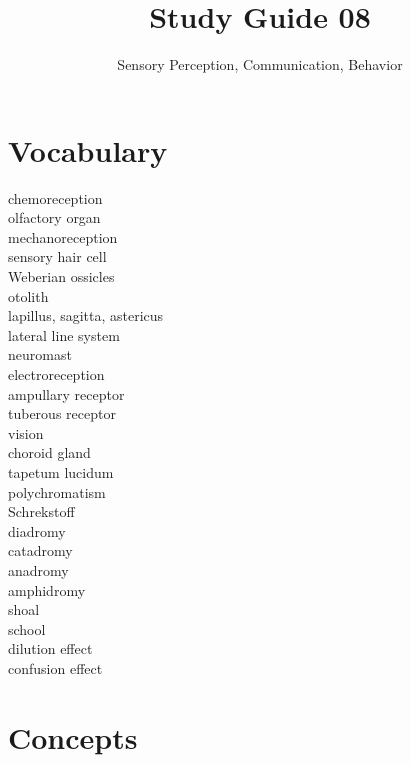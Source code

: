 \documentclass[nofonts, letterpaper]{tufte-handout}
\title{Study Guide 08}
\author{Sensory Perception, Communication, Behavior}
\date{} %
\begin{document}
\maketitle	%


\section{Vocabulary} 
\vspace{-1\baselineskip}
\begin{multicols}{2}
chemoreception \\
olfactory organ \\
mechanoreception \\
sensory hair cell \\
Weberian ossicles \\
otolith \\
lapillus, sagitta, astericus \\
lateral line system \\
neuromast \\
electroreception \\
ampullary receptor \\
tuberous receptor \\
vision \\
choroid gland \\
tapetum lucidum \\
polychromatism \\
Schrekstoff \\
diadromy \\
catadromy \\
anadromy \\
amphidromy \\
shoal \\
school \\
dilution effect \\
confusion effect 
\end{multicols}

\section{Concepts}
\end{document}
